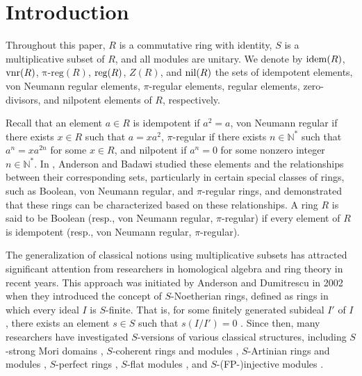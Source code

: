 \documentclass[12pt]{article}
\def\preg{\mathrm{\pi\text{-}reg}}
\def\idem{{\rm idem}}
\def\nil{{\rm nil}}
\def\vnr{{\rm vnr}}
\def\reg{{\rm reg}}
\begin{document}
 
\section{Introduction}  

\hskip 0.5cm Throughout this paper, $R$ is a commutative ring with identity, $S$ is a multiplicative subset of $R$, and all modules are unitary. We denote by $\idem(R)$, $\vnr(R)$, $\preg(R)$, $\reg(R)$, $Z(R)$, and $\nil(R)$ the sets of idempotent elements, von Neumann regular elements, $\pi$-regular elements, regular elements, zero-divisors, and nilpotent elements of $R$, respectively.  

Recall that an element $a \in R$ is idempotent if $a^2 = a$, von Neumann regular if there exists $x \in R$ such that $a = xa^2$, $\pi$-regular if there exists $n \in \mathbb{N}^*$ such that $a^n = xa^{2n}$ for some $x \in R$, and nilpotent if $a^n = 0$ for some nonzero integer $n \in \mathbb{N}^*$. In \cite{And1}, Anderson and Badawi studied these elements and the relationships between their corresponding sets, particularly in certain special classes of rings, such as Boolean, von Neumann regular, and $\pi$-regular rings, and demonstrated that these rings can be characterized based on these relationships.   A ring $R$ is said to be Boolean (resp., von Neumann regular, $\pi$-regular) if every element of $R$ is idempotent (resp., von Neumann regular, $\pi$-regular).  



   The generalization of classical notions using multiplicative subsets has attracted significant attention from researchers in homological algebra and ring theory in recent years. This approach was initiated by Anderson and Dumitrescu in 2002 when they introduced the concept of $S$-Noetherian rings, defined as rings in which every ideal $I$ is $S$-finite. That is, for some finitely generated subideal $I'$ of $I$, there exists an element $s \in S$ such that $s(I/I') = 0$ \cite{And6}. Since then, many researchers have investigated $S$-versions of various classical structures, including $S$-strong Mori domains \cite{Kim1}, $S$-coherent rings and modules \cite{Ben1}, $S$-Artinian rings and modules \cite{Sev1}, $S$-perfect rings \cite{Bou1}, $S$-flat modules \cite{Qi1}, and $S$-(FP-)injective modules \cite{Bou3, Bou4}. 
\end{document}
